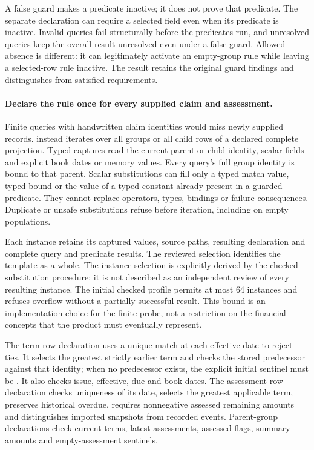 A false guard makes a predicate inactive; it does not prove that predicate.
The separate  declaration can require a selected field
even when its predicate is inactive. Invalid queries fail structurally before
the predicates run, and unresolved queries keep the overall result unresolved
even under a false guard. Allowed absence is different: it can legitimately
activate an empty-group rule while leaving a selected-row rule inactive. The
result retains the original guard findings and distinguishes
 from satisfied requirements.

\paragraph{Declare the rule once for every supplied claim and assessment.}
Finite queries with handwritten claim identities would miss newly supplied
records.  instead iterates over all groups
or all child rows of a declared complete projection. Typed captures read the
current parent or child identity, scalar fields and explicit book dates or
memory values. Every query's full group identity is bound to that parent.
Scalar substitutions can fill only a typed match value, typed bound or the
value of a typed constant already present in a guarded predicate. They cannot
replace operators, types, bindings or failure consequences. Duplicate or
unsafe substitutions refuse before iteration, including on empty populations.

Each instance retains its captured values, source paths, resulting declaration
and complete query and predicate results. The reviewed selection identifies
the template as a whole. The instance selection is explicitly derived by the
checked substitution procedure; it is not described as an independent review
of every resulting instance. The initial checked profile permits at most
64 instances and refuses overflow without a partially successful result.
This bound is an implementation choice for the finite probe, not a restriction
on the financial concepts that the product must eventually represent.

The term-row declaration uses a unique match at each effective date to reject
ties. It selects the greatest strictly earlier term and checks the stored
predecessor against that identity; when no predecessor exists, the explicit
initial sentinel must be . It also checks issue, effective, due and
book dates. The assessment-row declaration checks uniqueness of its date,
selects the greatest applicable term, preserves historical overdue, requires
nonnegative assessed remaining amounts and distinguishes imported snapshots
from recorded events. Parent-group declarations check current terms, latest
assessments, assessed flags, summary amounts and empty-assessment sentinels.

